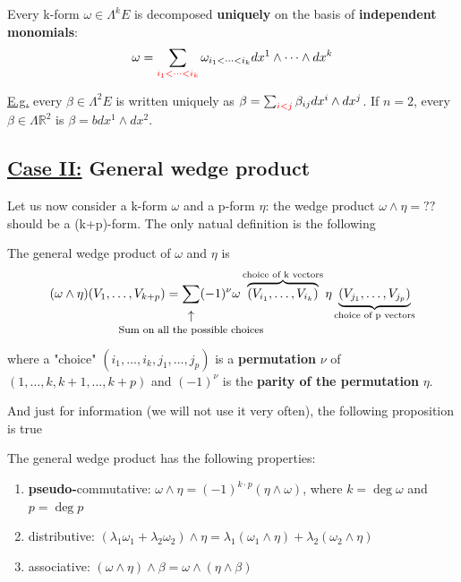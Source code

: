 \documentclass[../main.tex]{subfiles}
\begin{document}
\begin{corollary}
Every k-form $\omega\in\Lambda^k E$ is decomposed \textbf{uniquely} on the basis of \textbf{independent monomials}:
\[
\omega=\sum_{\color{red}i_1<\dots<i_k}\omega_{i_1<\dots<i_k}dx^1\wedge\dots\wedge dx^k
\]
\end{corollary}
\underline{E.g.} every $\beta\in\Lambda^2 E$ is written uniquely as $\beta=\sum_{\color{red}i<j}\beta_{ij}dx^i\wedge dx^j$. If $n=2$, every $\beta\in\Lambda\mathbb{R}^2$ is $\beta=bdx^1\wedge dx^2$.
\subsection{\underline{Case II:} General wedge product}Let us now consider a k-form $\omega$ and a p-form $\eta$: the wedge product $\omega\wedge\eta=??$ should be a (k+p)-form. The only natual definition is the following
\begin{definition}
The general wedge product of $\omega$ and $\eta$ is
\[
(\omega\wedge\eta)(V_1,\dots,V_{k+p})= \underset{\mathclap{\tikz \node {$\uparrow$} node [below=1ex] {\footnotesize Sum on all the possible choices };}} \sum(-1)^{\nu}\omega \overbrace{(V_{i_1},\dots,V_{i_k})}^{\textrm{choice of k vectors}} \eta \underbrace{(V_{j_1},\dots,V_{j_p})}_{\textrm{choice of p vectors}}
\]
where a "choice" $(i_1,\dots,i_k,j_1,\dots,j_p)$ is a \textbf{permutation} $\nu$ of $(1,\dots,k,k+1,\dots,k+p)$ and $(-1)^{\nu}$ is the \textbf{parity of the permutation} $\eta$.
\end{definition}
And just for information (we will not use it very often), the following proposition is true
\begin{proposition}
The general wedge product has the following properties:
\begin{enumerate}
    \item \textbf{pseudo-}commutative: $\omega\wedge\eta=(-1)^{k\cdot p}(\eta\wedge\omega)$, where $k=\deg\omega$ and $p=\deg p$
    \item distributive: $(\lambda_1\omega_1+\lambda_2\omega_2)\wedge\eta=\lambda_1(\omega_1\wedge\eta)+\lambda_2(\omega_2\wedge\eta)$
    \item associative: $(\omega\wedge\eta)\wedge\beta=\omega\wedge(\eta\wedge\beta)$
\end{enumerate}
\end{proposition}
\end{document}
